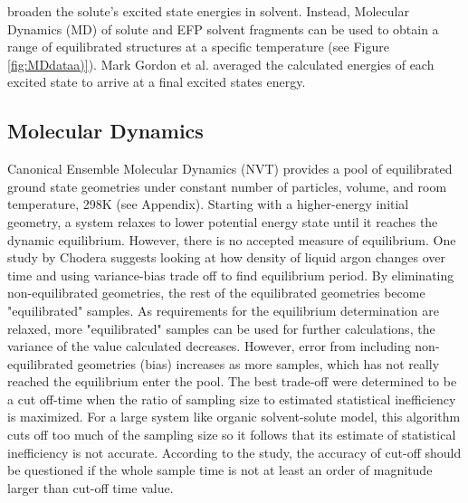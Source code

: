 \documentclass[
journal=jpcbfk, %
manuscript=article]{achemso}
\begin{document}
broaden the solute's excited state energies in solvent. Instead, Molecular Dynamics (MD) of solute and EFP solvent fragments can be used to obtain a range of equilibrated structures at a specific temperature (see Figure \ref{fig:MDdataa)}). Mark Gordon et al. averaged the calculated energies of each excited state to arrive at a final excited states energy.\cite{Defusco2011}
		
	\subsection{Molecular Dynamics}
	Canonical Ensemble Molecular Dynamics (NVT)\cite{Schmidt1993} provides a pool of equilibrated ground state geometries under constant number of particles, volume, and  room temperature, 298K (see Appendix). Starting with a higher-energy initial geometry, a system relaxes to lower potential energy state until it reaches the dynamic equilibrium. However, there is no accepted measure of equilibrium. One study by Chodera suggests looking at how density of liquid argon changes over time and using variance-bias trade off to find equilibrium period.\cite{Chodera2015} By eliminating non-equilibrated geometries, the rest of the equilibrated geometries become "equilibrated" samples. As requirements for the equilibrium determination are relaxed, more "equilibrated" samples can be used for further calculations, the variance of the value calculated decreases. However, error from including non-equilibrated geometries (bias) increases as more samples, which has not really reached the equilibrium enter the pool. The best trade-off were determined to be a cut off-time when the ratio of sampling size to estimated statistical inefficiency is maximized. For a large system like organic solvent-solute model, this algorithm cuts off too much of the sampling size so it follows that its estimate of statistical inefficiency is not accurate. According to the study, the accuracy of cut-off should be questioned if the whole sample time is not at least an order of magnitude larger than cut-off time value.
		
\end{document}
